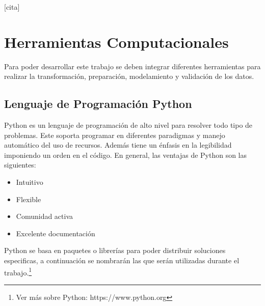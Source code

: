 [cita] 

\section{Herramientas Computacionales}
Para poder desarrollar este trabajo se deben integrar diferentes herramientas para realizar la transformación, preparación, modelamiento y validación de los datos.
\subsection{Lenguaje de Programación Python}
Python es un lenguaje de programación de alto nivel para resolver todo tipo de problemas. Este soporta programar en diferentes paradigmas y manejo automático del uso de recursos. Además tiene un énfasis en la legibilidad imponiendo un orden en el código.
En general, las ventajas de Python son las siguientes:
\begin{itemize}
  \item Intuitivo
  \item Flexible
  \item Comunidad activa
  \item Excelente documentación
\end{itemize}
Python se basa en paquetes o librerías para poder distribuir soluciones especificas, a continuación se nombrarán las que serán utilizadas durante el trabajo.\footnote{Ver más sobre Python: https://www.python.org}
